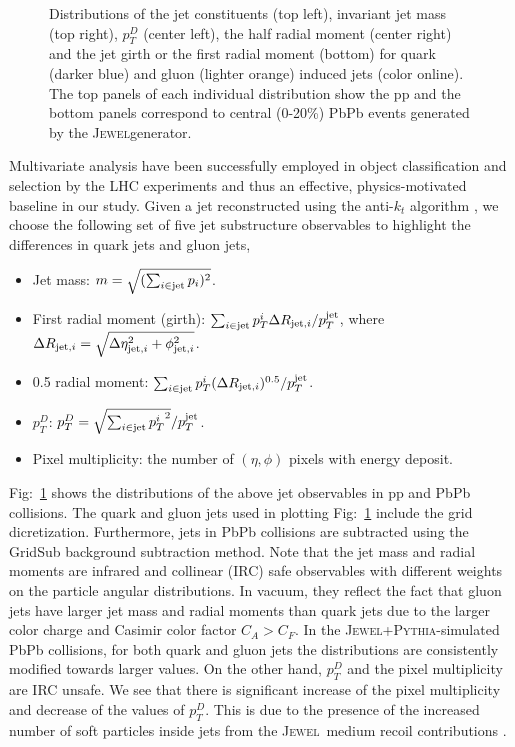 \documentclass[notoc]{JHEP3}
\newcommand{\jw}{\textsc{Jewel}}
\newcommand{\jwpy}{\textsc{Jewel+Pythia}}
\begin{document}
\begin{figure}[h]
	   \caption{Distributions of the jet constituents (top left), invariant jet mass (top right), $p^{D}_{T}$ (center left), the half radial moment (center right) and the jet girth or the first radial moment (bottom) for quark (darker blue) and gluon (lighter orange) induced jets (color online). The top panels of each individual distribution show the pp and the bottom panels correspond to central (0-20\%) PbPb events generated by the \jw generator.}
	   \label{fig:jetdistributons_pp_pbpb}
	\end{figure}

Multivariate analysis have been successfully employed in object classification and selection by the LHC experiments \cite{} and thus an effective, physics-motivated baseline in our study. Given a jet reconstructed using the anti-$k_{t}$ algorithm \cite{Cacciari:2008gp}, we choose the following set of five jet substructure observables \cite{} to highlight the differences in quark jets and gluon jets,
	\begin{itemize}
		\item Jet mass: $m = \sqrt{(\sum_{i\in {\rm jet}} p_i)^2}$. 
        \item First radial moment (girth): $\sum_{i \in {\rm jet}} p^i_{T} \Delta R_{{\rm jet}, i}/p^{\rm jet}_{T}$, where $\Delta R_{{\rm jet}, i}=\sqrt{\Delta \eta^2_{{\rm jet}, i}+\phi^2_{{\rm jet}, i}}$.
		\item 0.5 radial moment:  $\sum_{i \in {\rm jet}} p^i_{T} (\Delta R_{{\rm jet}, i})^{0.5}/p^{\rm jet}_{T}$.
        \item $p_{T}^{D}$: $p^{D}_{T} = \sqrt{\sum_{i \in {\rm jet}} {p^{i}_{T}}^2}/p^{\rm jet}_{T}$.
        \item Pixel multiplicity: the number of $(\eta,\phi)$ pixels with energy deposit. %
	\end{itemize}

Fig:~\ref{fig:jetdistributons_pp_pbpb} shows the distributions of the above jet observables in pp and PbPb collisions. The quark and gluon jets used in plotting Fig:~\ref{fig:jetdistributons_pp_pbpb} include the grid dicretization. Furthermore, jets in PbPb collisions are subtracted using the GridSub background subtraction method. Note that the jet mass and radial moments are infrared and collinear (IRC) safe observables with different weights on the particle angular distributions. In vacuum, they reflect the fact that gluon jets have larger jet mass and radial moments than quark jets due to the larger color charge and Casimir color factor $C_A>C_F$. In the \jwpy-simulated PbPb collisions, for both quark and gluon jets the distributions are consistently modified towards larger values. On the other hand, $p_T^D$ and the pixel multiplicity are IRC unsafe. We see that there is significant increase of the pixel multiplicity and decrease of the values of $p_T^D$. This is due to the presence of the increased number of soft particles inside jets from the \jw ~medium recoil contributions \cite{}.
\end{document}

